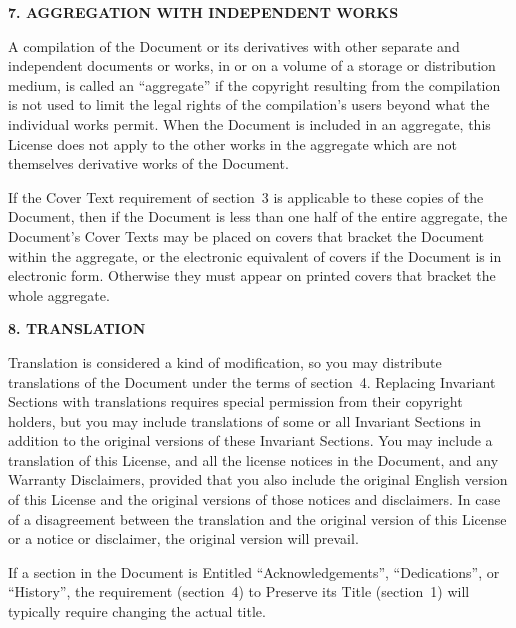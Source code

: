 \documentclass[a4paper]{report}
\begin{document}
\begin{center}
{\Large\bf 7. AGGREGATION WITH INDEPENDENT WORKS\par}
{}
\end{center}


A compilation of the Document or its derivatives with other separate
and independent documents or works, in or on a volume of a storage or
distribution medium, is called an ``aggregate'' if the copyright
resulting from the compilation is not used to limit the legal rights
of the compilation's users beyond what the individual works permit.
When the Document is included in an aggregate, this License does not
apply to the other works in the aggregate which are not themselves
derivative works of the Document.

If the Cover Text requirement of section~3 is applicable to these
copies of the Document, then if the Document is less than one half of
the entire aggregate, the Document's Cover Texts may be placed on
covers that bracket the Document within the aggregate, or the
electronic equivalent of covers if the Document is in electronic form.
Otherwise they must appear on printed covers that bracket the whole
aggregate.


\begin{center}
{\Large\bf 8. TRANSLATION\par}
{}
\end{center}


Translation is considered a kind of modification, so you may
distribute translations of the Document under the terms of section~4.
Replacing Invariant Sections with translations requires special
permission from their copyright holders, but you may include
translations of some or all Invariant Sections in addition to the
original versions of these Invariant Sections.  You may include a
translation of this License, and all the license notices in the
Document, and any Warranty Disclaimers, provided that you also include
the original English version of this License and the original versions
of those notices and disclaimers.  In case of a disagreement between
the translation and the original version of this License or a notice
or disclaimer, the original version will prevail.

If a section in the Document is Entitled ``Acknowledgements'',
``Dedications'', or ``History'', the requirement (section~4) to Preserve
its Title (section~1) will typically require changing the actual
title.
\end{document}

